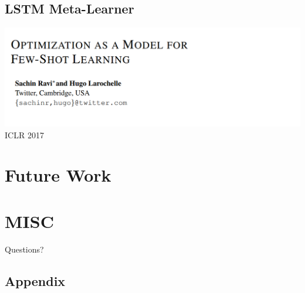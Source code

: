 \documentclass{beamer}
\newcommand{\weib}{\CJKfamily{weib}}
\begin{document}
\subsection{LSTM Meta-Learner}
\begin{frame}
  \includegraphics[width=\textwidth]{fig/LSTM-Meta-Learner.png}
  \center ICLR 2017
\end{frame}

\section{Future Work}

\section{MISC}
\begin{frame}
	\begin{center}
    \LARGE{Questions?}
	\end{center}
\end{frame}


\subsection{Appendix}
\end{document}
